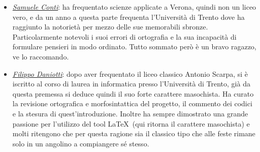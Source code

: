 \documentclass[class=book, crop=false, oneside]{standalone}
\begin{document}
\begin{minipage}{.3\textwidth}
	{%
		\setlength{\fboxsep}{0pt}%
		\setlength{\fboxrule}{1pt}%
	}%
\end{minipage}
\hspace{.01\textwidth}
\begin{minipage}{.7\textwidth}
    \begin{itemize}
		\item \emph{\href{https://github.com/Samaretas}{Samuele Conti}}: ha frequentato scienze applicate a Verona, quindi non un liceo vero, e da un anno a questa parte frequenta l'Università di Trento dove ha raggiunto la notorietà per mezzo delle sue memorabili sbronze. Particolarmente notevoli i suoi errori di ortografia e la sua incapacità di formulare pensieri in modo ordinato. Tutto sommato però è un bravo ragazzo, ve lo raccomando.
	\end{itemize}
\end{minipage}
\vskip 20pt
\begin{minipage}{.6\textwidth}
    \begin{itemize}
		\item \emph{\href{https://github.com/filippodaniotti}{Filippo Daniotti}}: dopo aver frequentato il liceo classico Antonio Scarpa, si è iscritto al corso di laurea in informatica presso l'Università di Trento, già da questa premessa si deduce quindi il suo forte carattere masochista. Ha curato la revisione ortografica e morfosintattica del progetto, il commento dei codici e la stesura di quest'introduzione. Inoltre ha sempre dimostrato una grande passione per l'utilizzo del tool \LaTeX\ (qui ritorna il carattere masochista) e molti ritengono che per questa ragione sia il classico tipo che alle feste rimane solo in un angolino a compiangere sé stesso.
	\end{itemize}
\end{minipage}
\end{document}
